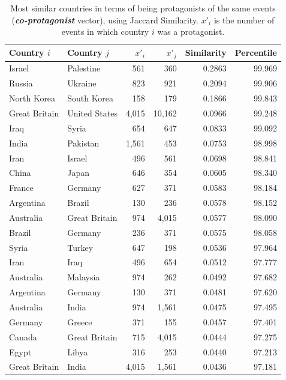 \begin{table}
  \centering
  \footnotesize
\begin{tabular}{llrrrr}
\toprule
Country $i$ & Country $j$ & $x'_i$ & $x'_j$ & Similarity & Percentile\\
\midrule
Israel & Palestine & 561 & 360 & 0.2863 & 99.969\\
Russia & Ukraine & 823 & 921 & 0.2094 & 99.906\\
North Korea & South Korea & 158 & 179 & 0.1866 & 99.843 \\
Great Britain & United States & 4,015 & 10,162 & 0.0966 & 99.248\\
Iraq & Syria & 654 & 647 & 0.0833 & 99.092\\
\addlinespace
India & Pakistan & 1,561 & 453 & 0.0753 & 98.998\\
Iran & Israel & 496 & 561 & 0.0698 & 98.841\\
China & Japan & 646 & 354 & 0.0605 & 98.340\\
France & Germany & 627 & 371 & 0.0583 & 98.184\\
\addlinespace
Argentina & Brazil & 130 & 236 & 0.0578 & 98.152\\
Australia & Great Britain & 974 & 4,015 & 0.0577 & 98.090\\
Brazil & Germany & 236 & 371 & 0.0575 & 98.058\\
Syria & Turkey & 647 & 198 & 0.0536 & 97.964\\
\addlinespace
Iran & Iraq & 496 & 654 & 0.0512 & 97.777\\
Australia & Malaysia & 974 & 262 & 0.0492 & 97.682\\
Argentina & Germany & 130 & 371 & 0.0481 & 97.620\\
Australia & India & 974 & 1,561 & 0.0475 & 97.495\\
\addlinespace
Germany & Greece & 371 & 155 & 0.0457 & 97.401\\
Canada & Great Britain & 715 & 4,015 & 0.0444 & 97.275\\
Egypt & Libya & 316 & 253 & 0.0440 & 97.213\\
Great Britain & India & 4,015 & 1,561 & 0.0436 & 97.181\\
\bottomrule
\end{tabular}
\caption[Most similar countries in terms if co-protagonism]{Most similar
countries in terms of being protagonists of the same events
(\emph{\textbf{co-protagonist}} vector), using Jaccard Similarity. $x'_i$ is the
number of events in which country $i$ was a protagonist.}\label{tab:jacc}
\end{table}

